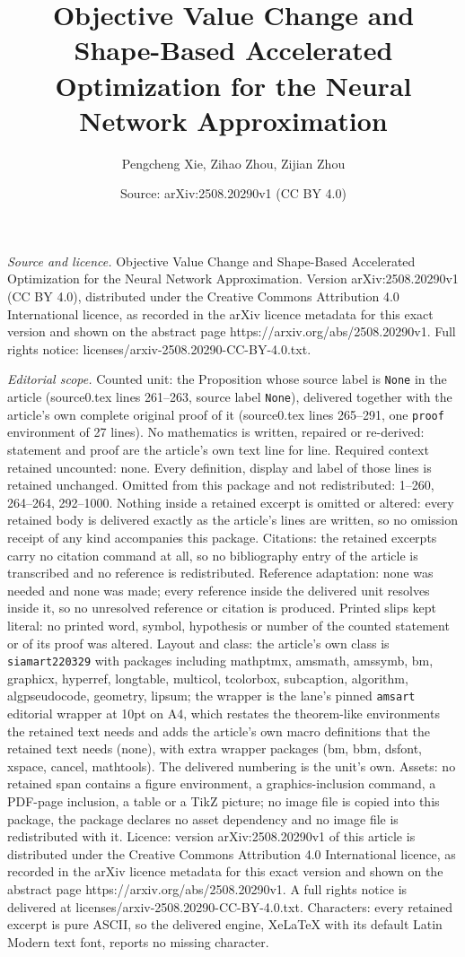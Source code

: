 \documentclass[10pt,a4paper]{amsart}
\title[Objective Value Change and Shape-Based Accelerated Optimizat]{Objective Value Change and Shape-Based Accelerated Optimization for the Neural Network Approximation}
\author{Pengcheng Xie, Zihao Zhou, Zijian Zhou}
\date{Source: arXiv:2508.20290v1 (CC BY 4.0)}
\begin{document}
\maketitle

\noindent\emph{Source and licence.} Objective Value Change and Shape-Based Accelerated Optimization for the Neural Network Approximation. Version arXiv:2508.20290v1 (CC BY 4.0), distributed under the Creative Commons Attribution 4.0 International licence, as recorded in the arXiv licence metadata for this exact version and shown on the abstract page https://arxiv.org/abs/2508.20290v1. Full rights notice: licenses/arxiv-2508.20290-CC-BY-4.0.txt.\par\smallskip

\noindent\textit{Editorial scope.} Counted unit: the Proposition whose source label is \texttt{None} in the article (source0.tex lines 261--263, source label \texttt{None}), delivered together with the article's own complete original proof of it (source0.tex lines 265--291, one \texttt{proof} environment of 27 lines). No mathematics is written, repaired or re-derived: statement and proof are the article's own text line for line. Required context retained uncounted: none. Every definition, display and label of those lines is retained unchanged. Omitted from this package and not redistributed: 1--260, 264--264, 292--1000. Nothing inside a retained excerpt is omitted or altered: every retained body is delivered exactly as the article's lines are written, so no omission receipt of any kind accompanies this package. Citations: the retained excerpts carry no citation command at all, so no bibliography entry of the article is transcribed and no reference is redistributed. Reference adaptation: none was needed and none was made; every reference inside the delivered unit resolves inside it, so no unresolved reference or citation is produced. Printed slips kept literal: no printed word, symbol, hypothesis or number of the counted statement or of its proof was altered. Layout and class: the article's own class is \texttt{siamart220329} with packages including mathptmx, amsmath, amssymb, bm, graphicx, hyperref, longtable, multicol, tcolorbox, subcaption, algorithm, algpseudocode, geometry, lipsum; the wrapper is the lane's pinned \texttt{amsart} editorial wrapper at 10pt on A4, which restates the theorem-like environments the retained text needs and adds the article's own macro definitions that the retained text needs (none), with extra wrapper packages (bm, bbm, dsfont, xspace, cancel, mathtools). The delivered numbering is the unit's own. Assets: no retained span contains a figure environment, a graphics-inclusion command, a PDF-page inclusion, a table or a TikZ picture; no image file is copied into this package, the package declares no asset dependency and no image file is redistributed with it. Licence: version arXiv:2508.20290v1 of this article is distributed under the Creative Commons Attribution 4.0 International licence, as recorded in the arXiv licence metadata for this exact version and shown on the abstract page https://arxiv.org/abs/2508.20290v1. A full rights notice is delivered at licenses/arxiv-2508.20290-CC-BY-4.0.txt. Characters: every retained excerpt is pure ASCII, so the delivered engine, XeLaTeX with its default Latin Modern text font, reports no missing character.
\end{document}
